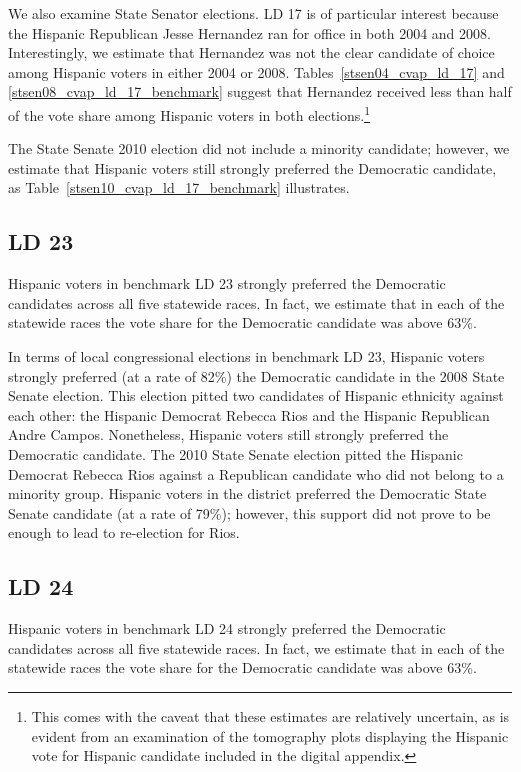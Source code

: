 \documentclass[12pt]{article}
\begin{document}
We also examine State Senator elections. LD 17 is of particular interest because the Hispanic Republican Jesse Hernandez ran for office in both 2004 and 2008. Interestingly, we estimate that Hernandez was not the clear candidate of choice among Hispanic voters in either 2004 or 2008. Tables~\ref{stsen04_cvap_ld_17} and \ref{stsen08_cvap_ld_17_benchmark} suggest that Hernandez received less than half of the vote share among Hispanic voters in both elections.\footnote{This comes with the caveat that these estimates are relatively uncertain, as is evident from an examination of the tomography plots displaying the Hispanic vote for Hispanic candidate included in the digital appendix.}

The State Senate 2010 election did not include a minority candidate; however, we estimate that Hispanic voters still strongly preferred the Democratic candidate, as Table~\ref{stsen10_cvap_ld_17_benchmark} illustrates. 

\subsection{LD 23}

Hispanic voters in benchmark LD 23 strongly preferred the Democratic candidates across all five statewide races. In fact, we estimate that in each of the statewide races the vote share for the Democratic candidate was above 63\%. 

In terms of local congressional elections in benchmark LD 23, Hispanic voters strongly preferred (at a rate of 82\%)
the Democratic candidate in the 2008 State Senate election. This election pitted two 
candidates of Hispanic ethnicity against each other: the Hispanic Democrat Rebecca Rios
and the Hispanic Republican Andre Campos. Nonetheless, Hispanic voters still strongly preferred the Democratic candidate. 
The 2010 State Senate election pitted the Hispanic Democrat Rebecca Rios against a Republican candidate who did not belong to a minority group. Hispanic voters in the district preferred the Democratic State Senate candidate (at a rate of 79\%); however, this support did not prove to be enough to lead to re-election for Rios.

\subsection{LD 24}

Hispanic voters in benchmark LD 24 strongly preferred the Democratic candidates across all five statewide races. In fact, we estimate that in each of the statewide races the vote share for the Democratic candidate was above 63\%. 
\end{document}
